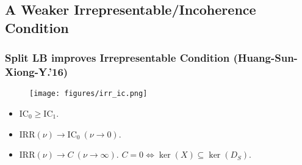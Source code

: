 \documentclass[slidestop,compress,9pt,epsfig,color]{beamer}
\theoremstyle{example}
\begin{document}
\subsection{A Weaker Irrepresentable/Incoherence Condition}
\begin{frame}
    \frametitle{Split LB improves Irrepresentable Condition (Huang-Sun-Xiong-Y.'16)}
    \begin{figure}
        \centering
        \texttt{[image: figures/irr\_ic.png]}
        \label{fig:irr-ic}
    \end{figure}
    \begin{theorem}[\textcolor{blue}{Huang-Sun-Xiong-Y.'2016}]
        \label{thm:irr-ic}
        \begin{itemize}
            \item
                $\mathrm{IC}_0 \ge \mathrm{IC}_1$.
            \item
                $\mathrm{IRR}(\nu) \rightarrow \mathrm{IC}_0\ (\nu \rightarrow 0)$.
            \item
                $\mathrm{IRR}(\nu) \rightarrow C\ (\nu \rightarrow \infty)$. $C = 0 \Longleftrightarrow \ker(X) \subseteq \ker(D_S)$.
        \end{itemize}
    \end{theorem}
\end{frame}
\end{document}

